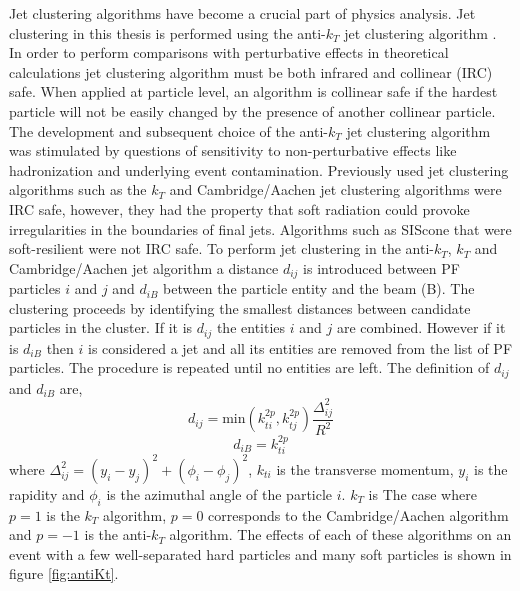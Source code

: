 Jet clustering algorithms have become a crucial part of physics analysis.
Jet clustering in this thesis is performed using 
the anti-$k_{T}$ jet clustering algorithm \cite{Cacciari:2008gp}.
In order to perform 
comparisons with perturbative effects in theoretical calculations jet clustering algorithm
must be both infrared and collinear (IRC) safe. 
When applied at particle level, an algorithm is collinear safe if the hardest particle
will not be easily changed by the presence of another collinear particle. %
The development and subsequent choice of the anti-$k_{T}$ jet clustering algorithm
was stimulated by questions of sensitivity to non-perturbative effects like hadronization
and underlying event contamination. Previously used jet clustering algorithms
such as the $k_{T}$ \cite{ktAlgo} %
and Cambridge/Aachen \cite{cambAachen} %
jet clustering algorithms were IRC safe, however, they
had the property that soft radiation could provoke irregularities in the boundaries
of final jets. 
Algorithms such as SIScone \cite{SISCone} %
that were soft-resilient were not IRC safe.
To perform jet clustering in the anti-$k_{T}$, $k_{T}$ and Cambridge/Aachen jet algorithm
a distance $d_{ij}$ is introduced between PF particles $i$ and $j$ and $d_{iB}$ between
the particle entity and the beam (B). The clustering proceeds by identifying the smallest distances
between candidate particles in the cluster.
If it is $d_{ij}$ the entities $i$ and $j$ are combined. However if it is $d_{iB}$ then $i$ 
is considered a jet and all its entities are removed from the list of PF particles. The procedure
is repeated until no entities are left. The definition of $d_{ij}$ and $d_{iB}$ are,
\begin{equation}
d_{ij}=\mathrm{min}(k_{ti}^{2p},k_{tj}^{2p})\frac{\Delta^{2}_{ij}}{R^{2}}
\end{equation}
\begin{equation}
d_{iB}=k_{ti}^{2p}
\end{equation}
where $\Delta_{ij}^{2}=(y_{i}-y_{j})^{2}+(\phi_{i}-\phi_{j})^{2}$, $k_{ti}$ is the 
transverse momentum, $y_{i}$ is the rapidity and $\phi_{i}$ is the azimuthal angle of 
the particle $i$. 
$k_{T}$ is %
The case where $p=1$ is the $k_{T}$ algorithm, $p=0$ corresponds to the Cambridge/Aachen
algorithm and $p=-1$ is the anti-$k_{T}$ algorithm.
The effects of each of these algorithms on an event with a few well-separated hard particles
and many soft particles is shown in figure \ref{fig:antiKt}.%


